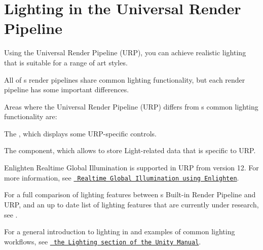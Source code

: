 \chapter{Lighting in the Universal Render Pipeline}
\hypertarget{md__hey_tea_9_2_library_2_package_cache_2com_8unity_8render-pipelines_8universal_0d14_80_88_2_documentation_0i_2lighting}{}\label{md__hey_tea_9_2_library_2_package_cache_2com_8unity_8render-pipelines_8universal_0d14_80_88_2_documentation_0i_2lighting}
\label{md__hey_tea_9_2_library_2_package_cache_2com_8unity_8render-pipelines_8universal_0d14_80_88_2_documentation_0i_2lighting_autotoc_md2200}%
%
 Using the Universal Render Pipeline (URP), you can achieve realistic lighting that is suitable for a range of art styles.

All of \textquotesingle{}s render pipelines share common lighting functionality, but each render pipeline has some important differences.

Areas where the Universal Render Pipeline (URP) differs from \textquotesingle{}s common lighting functionality are\+:


\begin{DoxyItemize}
\item The , which displays some URP-\/specific controls.
\item The  component, which allows  to store Light-\/related data that is specific to URP.
\item Enlighten Realtime Global Illumination is supported in URP from version 12. For more information, see \href{https://docs.unity3d.com/Manual/realtime-gi-using-enlighten.html}{\texttt{ Realtime Global Illumination using Enlighten}}.
\end{DoxyItemize}

For a full comparison of lighting features between \textquotesingle{}s Built-\/in Render Pipeline and URP, and an up to date list of lighting features that are currently under research, see .

For a general introduction to lighting in  and examples of common lighting workflows, see \href{https://docs.unity3d.com/Manual/LightingOverview.html}{\texttt{ the Lighting section of the Unity Manual}}. 
